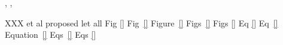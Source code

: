\cite{sss}\cite{aaa}
\cite{123ad},\cite{542}
\cite{sss}, \cite{aaa}
\cite{sfad} \cite{afqe2}

XXX et al proposed
let all %
Fig \ref{}
Fig~\ref{}
Figure~\ref{} %
Figs~\ref{}
Figs \ref{}
Eq \ref{}
Eq~\ref{}
Equation~\ref{} %
Eqs~\ref{}
Eqs \ref{}
